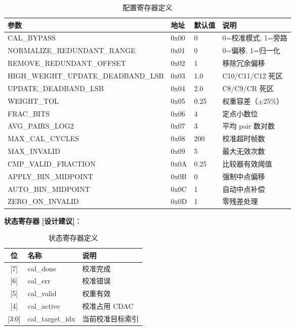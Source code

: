 \documentclass[UTF8,a4paper,11pt]{ctexart}
\newcommand{\suggested}{\textcolor{suggestblue}{\textbf{[设计建议]}}}
\begin{document}
\begin{table}[H]
\centering
\caption{配置寄存器定义}
\label{tab:config-regs}
\small
\begin{tabular}{llll}
\toprule
参数 & 地址 & 默认值 & 说明 \\
\midrule
CAL\_BYPASS                    & 0x00 & 0    & 0=校准模式, 1=旁路 \\
NORMALIZE\_REDUNDANT\_RANGE   & 0x01 & 0    & 0=偏移, 1=归一化 \\
REMOVE\_REDUNDANT\_OFFSET     & 0x02 & 1    & 移除冗余偏移 \\
HIGH\_WEIGHT\_UPDATE\_DEADBAND\_LSB & 0x03 & 1.0  & C10/C11/C12 死区 \\
UPDATE\_DEADBAND\_LSB          & 0x04 & 2.0  & C8/C9/CR 死区 \\
WEIGHT\_TOL                    & 0x05 & 0.25 & 权重容差（$\pm$25\%） \\
FRAC\_BITS                     & 0x06 & 4    & 定点小数位 \\
AVG\_PAIRS\_LOG2               & 0x07 & 3    & 平均 pair 数对数 \\
MAX\_CAL\_CYCLES               & 0x08 & 200  & 校准超时帧数 \\
MAX\_INVALID                   & 0x09 & 5    & 最大无效次数 \\
CMP\_VALID\_FRACTION           & 0x0A & 0.25 & 比较器有效阈值 \\
APPLY\_BIN\_MIDPOINT           & 0x0B & 0    & 强制中点偏移 \\
AUTO\_BIN\_MIDPOINT            & 0x0C & 1    & 自动中点补偿 \\
ZERO\_ON\_INVALID              & 0x0D & 1    & 零残差处理 \\
\bottomrule
\end{tabular}
\end{table}

\textbf{状态寄存器} \suggested：

\begin{table}[H]
\centering
\caption{状态寄存器定义}
\label{tab:status-regs}
\begin{tabular}{cll}
\toprule
位 & 名称 & 说明 \\
\midrule
{[7]}   & cal\_done      & 校准完成 \\
{[6]}   & cal\_err       & 校准错误 \\
{[5]}   & cal\_valid     & 权重有效 \\
{[4]}   & cal\_active    & 校准占用 CDAC \\
{[3:0]} & cal\_target\_idx & 当前校准目标索引 \\
\bottomrule
\end{tabular}
\end{table}
\end{document}
